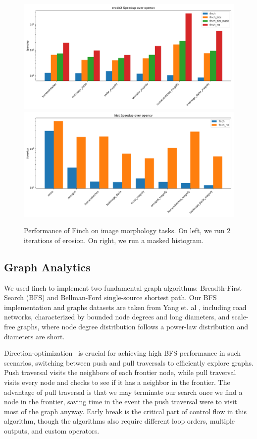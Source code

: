 \begin{figure}
	\includegraphics[width=0.5\linewidth]{erode2_speedup_over_opencv.png}%
	\includegraphics[width=0.5\linewidth]{hist_speedup_over_opencv.png}
 \vspace{-8pt}
    \caption{Performance of Finch on image morphology tasks. On left, we run 2 iterations of erosion. On right, we run a masked histogram.}\label{fig:morphology}
\end{figure}

\subsection{Graph Analytics}

We used finch to implement two fundamental graph algorithms: Breadth-First Search (BFS) and Bellman-Ford single-source shortest path. Our BFS implementation and graphs datasets are taken from Yang et. al \cite{yang_implementing_2018}, including road networks, characterized by bounded node degrees and long diameters, and scale-free graphs, where node degree distribution follows a power-law distribution and diameters are short.

Direction-optimization~\cite{beamer2012direction} is crucial for achieving high BFS performance in such scenarios, switching between push and pull traversals to efficiently explore graphs. Push traversal visits the neighbors of each frontier node, while pull traversal visits every node and checks to see if it has a neighbor in the frontier. The advantage of pull traversal is that we may terminate our search once we find a node in the frontier, saving time in the event the push traversal were to visit most of the graph anyway. Early break is the critical part of control flow in this algorithm, though the algorithms also require different loop orders, multiple outputs, and custom operators.

